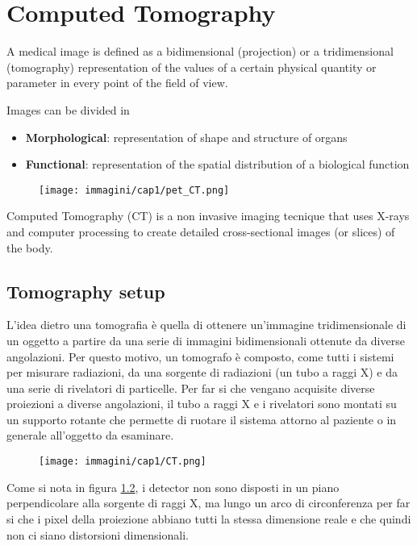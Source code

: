 \chapter{Computed Tomography}

A medical image is defined as a bidimensional (projection) or a tridimensional (tomography) representation of the values of a certain physical quantity or parameter in every point of the field of view. 

Images can be divided in 
\begin{itemize}
    \item \textbf{Morphological}: representation of shape and structure of organs 
    \item \textbf{Functional}: representation of the spatial distribution of a biological function 
\end{itemize}


\begin{figure}[h]
    \centering
    \texttt{[image: immagini/cap1/pet\_CT.png]} 
    \caption{} 
    \label{fig:pet_CT} 
\end{figure}

Computed Tomography (CT) is a non invasive imaging tecnique that uses  X-rays and computer processing to create detailed cross-sectional images (or slices) of the body. 
\section{Tomography setup}
L'idea dietro una tomografia è quella di ottenere un'immagine tridimensionale di un oggetto a partire da una serie di immagini bidimensionali ottenute da diverse angolazioni.
Per questo motivo, un tomografo è composto, come tutti i sistemi per misurare radiazioni, da una sorgente di radiazioni (un tubo a raggi X) e da una serie di rivelatori di particelle. Per far si che vengano acquisite diverse proiezioni a diverse angolazioni, il tubo a raggi X e i rivelatori sono montati su un supporto rotante che permette di ruotare il sistema attorno al paziente o in generale all'oggetto da esaminare.
\begin{figure}[h]
    \centering
    \texttt{[image: immagini/cap1/CT.png]} 
    \caption{} 
    \label{fig:tomografia}
\end{figure}

Come si nota in figura \ref{fig:tomografia}, i detector non sono disposti in un piano perpendicolare alla sorgente di raggi X, ma lungo un arco di circonferenza per far si che i pixel della proiezione abbiano tutti la stessa dimensione reale e che quindi non ci siano distorsioni dimensionali. 


